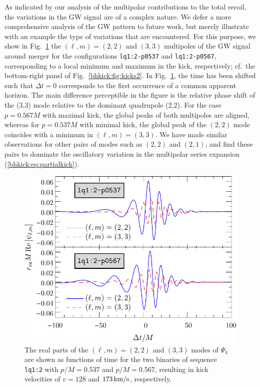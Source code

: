 As indicated by our analysis of the multipolar contributions
to the total recoil, the variations in the GW signal are of a
complex nature. We defer a more comprehensive analysis of
the GW pattern to future work, but merely illustrate with an
example the type of variations that are encountered.
For this purpose, we show in Fig.~\ref{bhkick:fig:psi4modes}
the $(\ell,m)=(2,2)$ and $(3,3)$ multipoles of the
GW signal around merger for the configurations \texttt{lq1:2-p0537}
and \texttt{lq1:2-p0567}, corresponding to a local minimum and
maximum in the
kick, respectively; cf.~the bottom-right panel of Fig.~\ref{bhkick:fig:kicks2}. In Fig.~\ref{bhkick:fig:psi4modes},
the time has been shifted such that $\Delta t =0$ corresponds
to the first occurrence of a common apparent horizon. The main
difference perceptible in the figure is the relative phase shift of
the (3,3) mode relative to the dominant quadrupole (2,2). For the
case $p=0.567M$ with maximal kick, the global peaks of both multipoles
are aligned, whereas for $p=0.537M$ with minimal kick, the global peak
of the $(2,2)$ mode coincides with a minimum in $(\ell,m)=(3,3)$. We
have made similar observations for other pairs of modes such as
$(2,2)$ and $(2,1)$, and find these pairs to dominate the oscillatory
variation in the multipolar series expansion (\ref{bhkick:eq:partialkick}).
%
\begin{figure}[t]
    \centering
    \includegraphics[width=0.7\columnwidth,clip=true]{bhkick/mode-kick-extrema.pdf}
    \caption{The real parts of the $(\ell,m)=(2,2)$ and $(3,3)$ modes of $\Psi_4$
             are shown as functions of time for the two binaries
             of sequence \texttt{lq1:2} with $p/M=0.537$ and $p/M=0.567$,
             resulting in kick velocities of $v = 128$
             and $173\,{\rm km/s}$, respectively.
            }
             \label{bhkick:fig:psi4modes}
\end{figure}
%



